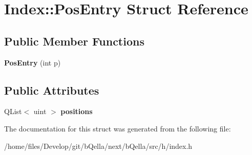 \hypertarget{structIndex_1_1PosEntry}{
\section{Index::PosEntry Struct Reference}
\label{structIndex_1_1PosEntry}
}
\subsection*{Public Member Functions}
\begin{DoxyCompactItemize}
\item 
\hypertarget{structIndex_1_1PosEntry_a4cb4e1cb1e76c10de0728a65602dc693}{
{\bfseries PosEntry} (int p)}
\label{structIndex_1_1PosEntry_a4cb4e1cb1e76c10de0728a65602dc693}

\end{DoxyCompactItemize}
\subsection*{Public Attributes}
\begin{DoxyCompactItemize}
\item 
\hypertarget{structIndex_1_1PosEntry_aa32c0fcde7de934a48d6c6871e820bbc}{
QList$<$ uint $>$ {\bfseries positions}}
\label{structIndex_1_1PosEntry_aa32c0fcde7de934a48d6c6871e820bbc}

\end{DoxyCompactItemize}


The documentation for this struct was generated from the following file:\begin{DoxyCompactItemize}
\item 
/home/files/Develop/git/bQella/next/bQella/src/h/index.h\end{DoxyCompactItemize}
